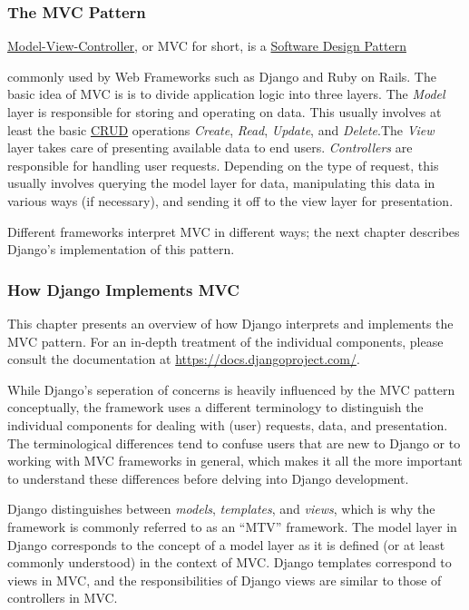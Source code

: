 \subsubsection{The MVC Pattern}
\label{sec:mvc}

\href{https://en.wikipedia.org/wiki/Model_view_controller}{Model-View-Controller},
or MVC for short, is a
\href{https://en.wikipedia.org/wiki/Software_design_pattern}{Software Design Pattern}

commonly used by Web Frameworks such as Django and Ruby on Rails. The
basic idea of MVC is is to divide application logic into three layers.
The \emph{Model} layer is responsible for storing and operating on
data. This usually involves at least the basic
\href{https://en.wikipedia.org/wiki/CRUD}{CRUD} operations
\emph{Create}, \emph{Read}, \emph{Update}, and \emph{Delete}.The
\emph{View} layer takes care of presenting available data to end
users. \emph{Controllers} are responsible for handling user requests.
Depending on the type of request, this usually involves querying the
model layer for data, manipulating this data in various ways (if
necessary), and sending it off to the view layer for presentation.

Different frameworks interpret MVC in different ways; the next chapter
describes Django's implementation of this pattern.

\subsubsection{How Django Implements MVC}
\label{sec:django-mvc}

This chapter presents an overview of how Django interprets and
implements the MVC pattern. For an in-depth treatment of the
individual components, please consult the documentation at
\url{https://docs.djangoproject.com/}.

While Django's seperation of concerns is heavily influenced by the MVC
pattern conceptually, the framework uses a different terminology to
distinguish the individual components for dealing with (user)
requests, data, and presentation. The terminological differences tend
to confuse users that are new to Django or to working with MVC
frameworks in general, which makes it all the more important to
understand these differences before delving into Django development.

Django distinguishes between \emph{models}, \emph{templates}, and
\emph{views}, which is why the framework is commonly referred to as an
``MTV'' framework. The model layer in Django corresponds to the
concept of a model layer as it is defined (or at least commonly
understood) in the context of MVC. Django templates correspond to
views in MVC, and the responsibilities of Django views are similar to
those of controllers in MVC.

